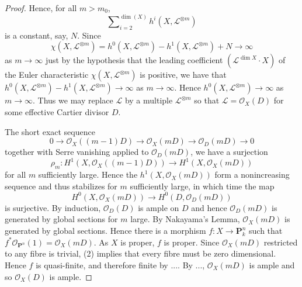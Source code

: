 \begin{proof}
Hence, for all $m > m_0$,
$$
 \sum\nolimits_{i = 2}^{\dim(X)} h^i(X,\mathcal{L}^{\otimes m})
$$
is a constant, say, $N$.
Since
$$
  \chi(X,\mathcal{L}^{\otimes m})
    = h^0(X,\mathcal{L}^{\otimes m}) - h^1(X,\mathcal{L}^{\otimes m})
      + N \to \infty
$$
as $m \to \infty$ just by the hypothesis that the leading coefficient
$(\mathcal{L}^{\dim X} \cdot X)$ of the Euler characteristic
$\chi(X,\mathcal{L}^{\otimes m})$ is positive,
we have that
$h^0(X,\mathcal{L}^{\otimes m}) - h^1(X,\mathcal{L}^{\otimes m}) \to \infty$
as $m \to \infty$.
Hence $h^0(X,\mathcal{L}^{\otimes m}) \to \infty$ as $m \to \infty$.
Thus we may replace $\mathcal{L}$ by a multiple $\mathcal{L}^{\otimes m}$
so that $\mathcal{L} = \mathcal{O}_X(D)$ for some effective Cartier divisor
$D$.

The short exact sequence
$$
  0 \to \mathcal{O}_X((m-1)D) \to \mathcal{O}_X(mD) \to \mathcal{O}_D(mD) \to 0
$$
together with Serre vanishing applied to $\mathcal{O}_D(mD)$,
we have a surjection
$$
\rho_m \colon H^1(X,\mathcal{O}_X((m -1)D)) \to H^1(X,\mathcal{O}_X(mD))
$$
for all $m$ sufficiently large.
Hence the $h^1(X,\mathcal{O}_X(mD))$ form a nonincreasing sequence and thus
stabilizes for $m$ sufficiently large, in which time the map
$$
H^0(X,\mathcal{O}_X(mD)) \to H^0(D,\mathcal{O}_D(mD))
$$
is surjective.
By induction, $\mathcal{O}_D(D)$ is ample on $D$ and hence $\mathcal{O}_D(mD)$
is generated by global sections for $m$ large.
By Nakayama's Lemma, $\mathcal{O}_X(mD)$ is generated by global sections.
Hence there is a morphism $f : X \to \mathbf{P}^n_k$ such that
$f^*\mathcal{O}_{\mathbf{P}^n}(1) = \mathcal{O}_X(mD)$.
As $X$ is proper, $f$ is proper.
Since $\mathcal{O}_X(mD)$ restricted to any fibre is trivial, (2) implies that
every fibre must be zero dimensional.
Hence $f$ is quasi-finite, and therefore finite by ....
By ..., $\mathcal{O}_X(mD)$ is ample
and so $\mathcal{O}_X(D)$ is ample.
\end{proof}






